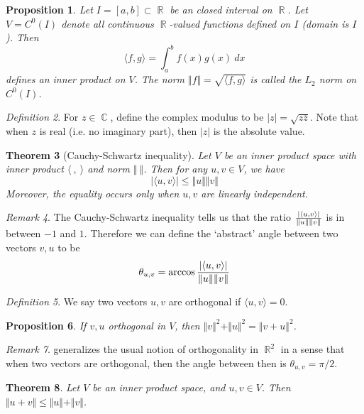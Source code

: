 \documentclass[12pt]{amsart}
\renewcommand{\leq}{\leqslant}
\DeclareMathOperator{\rr}{\mathbb{R}}
\DeclareMathOperator{\cc}{\mathbb{C}}
\newtheorem{theorem}{Theorem}[section]
\newtheorem{proposition}[theorem]{Proposition}
\theoremstyle{remark}
\newtheorem{remark}[theorem]{Remark}
\newtheorem{definition}[theorem]{Definition}
\numberwithin{equation}{section}
\begin{document}
	\begin{proposition}
		Let $I=[a,b]\subset \rr$ be an closed interval on $\rr$. Let $V=C^0(I)$ denote all continuous $\rr$-valued functions defined on $I$ (domain is $I$). Then
		\[\langle f,g\rangle =\int_a^bf(x)g(x)\ dx\]
		defines an inner product on $V$. The norm $\Vert f\Vert=\sqrt{\langle f,g\rangle}$ is called the $L_2$ norm on $C^0(I)$.
	\end{proposition}
	\begin{definition}
		For $z\in\cc$, define the complex modulus to be $|z|= \sqrt{z\overline{z}}$. Note that when $z$ is real (i.e. no imaginary part), then $|z|$ is the absolute value.
	\end{definition}
	
	\begin{theorem}[Cauchy-Schwartz inequality]
		Let $V$ be an inner product space with inner product $\langle\ ,\ \rangle$ and norm $\Vert\ \Vert$. Then for any $u,v\in V$, we have
		\[|\langle u,v\rangle| \leq  \Vert u\Vert \Vert v\Vert\]
		Moreover, the equality occurs only when $u,v$ are linearly independent.
	\end{theorem}
	\begin{remark}
		The Cauchy-Schwartz inequality tells us that the ratio $|\langle u,v\rangle |\over \Vert u\Vert \Vert v\Vert$ is in between $-1$ and $1$. Therefore we can define the `abstract' angle between two vectors $v,u$ to be
		\[\theta_{u,v}=\arccos {|\langle u,v\rangle |\over \Vert u\Vert \Vert v\Vert}\]
	\end{remark}
	\begin{definition}\label{def:ortho}
		We say two vectors $u,v$ are orthogonal if $\langle u,v\rangle = 0$.
	\end{definition}
	\begin{proposition}
		If $v,u$ orthogonal in $V$, then $\Vert v\Vert^2+\Vert u\Vert ^2 = \Vert v+u\Vert^2$.
	\end{proposition}
	\begin{remark}
		 generalizes the usual notion of orthogonality in $\rr^2$ in a sense that when two vectors are orthogonal, then the angle between then is $\theta_{u,v}=\pi/2$.
	\end{remark}
	\begin{theorem}Let $V$ be an inner product space, and $u,v\in V$. Then
		$\Vert u+v\Vert\leq \Vert u\Vert +\Vert v\Vert$.
	\end{theorem}
	
\end{document}
